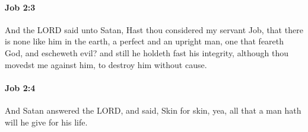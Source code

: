 		\paragraph{Job 2:3} %
			\label{JOB-2-3}

			And the LORD said unto Satan, Hast thou considered my servant Job, that there is none like him in the earth, a perfect and an upright man, one that feareth God, and escheweth evil? and still he holdeth fast his integrity, although thou movedst me against him, to destroy him without cause.


		\paragraph{Job 2:4} %
			\label{JOB-2-4}

			And Satan answered the LORD, and said, Skin for skin, yea, all that a man hath will he give for his life.



